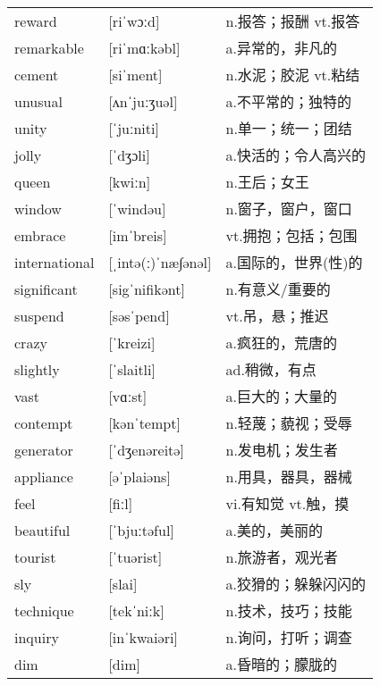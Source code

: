\documentclass[a4paper]{article}
\begin{document}
\section{}
\begin{tabular}{l l l}

reward & [riˈwɔːd] & n.报答；报酬 vt.报答 \\
remarkable & [riˈmɑːkəbl] & a.异常的，非凡的 \\
cement & [siˈment] & n.水泥；胶泥 vt.粘结 \\
unusual & [ʌnˈjuːʒuəl] & a.不平常的；独特的 \\
unity & [ˈjuːniti] & n.单一；统一；团结 \\
jolly & [ˈdʒɔli] & a.快活的；令人高兴的 \\
queen & [kwiːn] & n.王后；女王 \\
window & [ˈwindəu] & n.窗子，窗户，窗口 \\
embrace & [imˈbreis] & vt.拥抱；包括；包围 \\
international & [ˌintə(ː)ˈnæ∫ənəl] & a.国际的，世界(性)的 \\
significant & [sigˈnifikənt] & n.有意义/重要的 \\
suspend & [səsˈpend] & vt.吊，悬；推迟 \\
crazy & [ˈkreizi] & a.疯狂的，荒唐的 \\
slightly & [ˈslaitli] & ad.稍微，有点 \\
vast & [vɑːst] & a.巨大的；大量的 \\
contempt & [kənˈtempt] & n.轻蔑；藐视；受辱 \\
generator & [ˈdʒenəreitə] & n.发电机；发生者 \\
appliance & [əˈplaiəns] & n.用具，器具，器械 \\
feel & [fiːl] & vi.有知觉 vt.触，摸 \\
beautiful & [ˈbjuːtəful] & a.美的，美丽的 \\
tourist & [ˈtuərist] & n.旅游者，观光者 \\
sly & [slai] & a.狡猾的；躲躲闪闪的 \\
technique & [tekˈniːk] & n.技术，技巧；技能 \\
inquiry & [inˈkwaiəri] & n.询问，打听；调查 \\
dim & [dim] & a.昏暗的；朦胧的 \\

\end{tabular}
\end{document}

